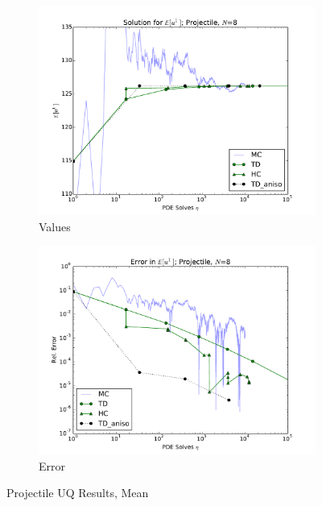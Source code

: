 \documentclass{mc2015}
\begin{document}
\begin{figure}[H]
    \centering
    \begin{subfigure}[b]{0.49 \textwidth}
      \includegraphics[width=\textwidth]{../graphics/projectile_solns_aniso}
      \caption{Values}
      \label{atn vals hdmr}
  \end{subfigure}
\begin{subfigure}[b]{0.49 \textwidth}
\centering
      \includegraphics[width=\textwidth]{../graphics/projectile_errs_aniso}
      \caption{Error}
      \label{atn errs hdmr}
    \end{subfigure}
  \caption{Projectile UQ Results, Mean}
  \label{proj anis mean}
  \end{figure}
\end{document}
